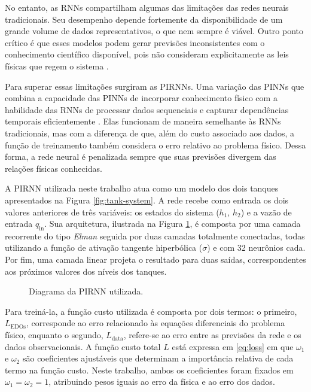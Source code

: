 No entanto, as RNNs compartilham algumas das limitações das redes neurais tradicionais. Seu desempenho depende fortemente da disponibilidade de um grande volume de dados representativos, o que nem sempre é viável. Outro ponto crítico é que esses modelos podem gerar previsões inconsistentes com o conhecimento científico disponível, pois não consideram explicitamente as leis físicas que regem o sistema \citep{karniadakis_2021}.

Para superar essas limitações surgiram as PIRNNs. Uma variação das PINNs que combina a capacidade das PINNs de incorporar conhecimento físico com a habilidade das RNNs de processar dados sequenciais e capturar dependências temporais eficientemente \citep{zheng_2023}. Elas funcionam de maneira semelhante às RNNs tradicionais, mas com a diferença de que, além do custo associado aos dados, a função de treinamento também considera o erro relativo ao problema físico. Dessa forma, a rede neural é penalizada sempre que suas previsões divergem das relações físicas conhecidas.

A PIRNN utilizada neste trabalho atua como um modelo dos dois tanques apresentados na Figura \ref{fig:tank-system}. A rede recebe como entrada os dois valores anteriores de três variáveis: os estados do sistema ($h_1$, $h_2$) e a vazão de entrada $q_{\mathrm{in}}$. Sua arquitetura, ilustrada na Figura \ref{fig:pirnn-diagram}, é composta por uma camada recorrente do tipo \textit{Elman} \citep{elman_1990} seguida por duas camadas totalmente conectadas, todas utilizando a função de ativação tangente hiperbólica ($\sigma$) e com 32 neurônios cada. Por fim, uma camada linear projeta o resultado para duas saídas, correspondentes aos próximos valores dos níveis dos tanques.

\begin{figure}[ht]
  \centering
  \resizebox{0.45\textwidth}{!}{}
  \caption{Diagrama da PIRNN utilizada.}
  \label{fig:pirnn-diagram}
\end{figure}

Para treiná-la, a função custo utilizada é composta por dois termos: o primeiro, $L_{\mathrm{EDOs}}$, corresponde ao erro relacionado às equações diferenciais do problema físico, enquanto o segundo, $L_{\mathrm{data}}$, refere-se ao erro entre as previsões da rede e os dados observacionais. A função custo total $L$ está expressa em \eqref{eq:loss} em que $\omega_1$ e $\omega_2$ são coeficientes ajustáveis que determinam a importância relativa de cada termo na função custo. Neste trabalho, ambos os coeficientes foram fixados em $\omega_1 = \omega_2 = 1$, atribuindo pesos iguais ao erro da física e ao erro dos dados.

